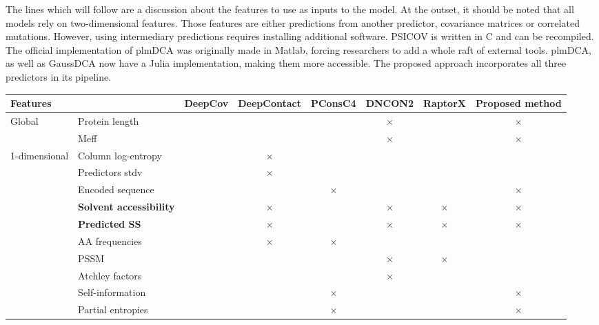         The lines which will follow are a discussion about the features to use as inputs
        to the model. At the outset, it should be noted that all models rely on
        two-dimensional features. Those features are either predictions from another
        predictor, covariance matrices or correlated mutations.
        However, using intermediary predictions requires installing additional software.
        PSICOV is written in C and can be recompiled. The official implementation of
        plmDCA was originally made in Matlab, forcing researchers to add a whole raft
        of external tools. plmDCA, as well as GaussDCA now have a Julia implementation,
        making them more accessible. The proposed approach incorporates all three
        predictors in its pipeline.

        \begin{landscape}
            \begin{table}[H]
                \centering
                \begin{tabular}{llcccccc}
                    \hline
                    Features & & DeepCov & DeepContact & PConsC4 & DNCON2 & RaptorX & Proposed method \\
                    \hline
                    \hline
                    Global & Protein length & & & & $\times$ & & $\times$ \\
                    & Meff & & & & $\times$ & & $\times$ \\
                    \hline
                    1-dimensional & Column log-entropy & & $\times$ & & & & \\
                    & Predictors stdv & & $\times$ & & & & \\
                    & Encoded sequence & & & $\times$ & & & $\times$ \\
                    & \textbf{Solvent accessibility} & & $\times$ & & $\times$ & $\times$ & $\times$ \\
                    & \textbf{Predicted SS} & & $\times$ & & $\times$ & $\times$ & $\times$ \\
                    & AA frequencies & & $\times$ & $\times$ & & & \\
                    & PSSM & & & & $\times$ & $\times$ & \\
                    & Atchley factors & & & & $\times$ & & \\
                    & Self-information & & & $\times$ & & & $\times$ \\
                    & Partial entropies & & & $\times$ & & & $\times$ \\

\end{tabular}
\end{table}
\end{landscape}
